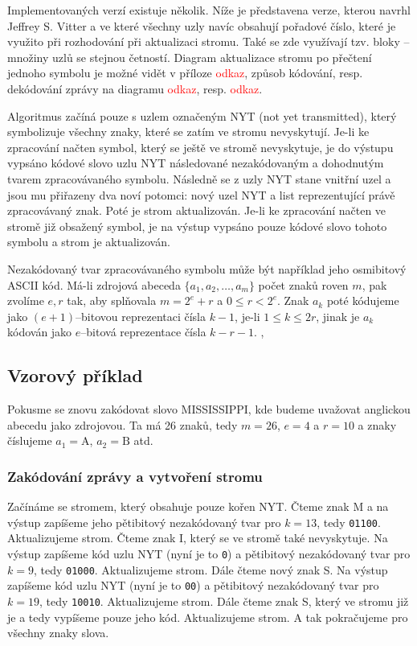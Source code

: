 Implementovaných verzí existuje několik. Níže je představena verze, kterou navrhl Jeffrey S. Vitter a ve které všechny uzly navíc obsahují pořadové číslo, které je využito při rozhodování při aktualizaci stromu. Také se zde využívají tzv. bloky -- množiny uzlů se stejnou četností. Diagram aktualizace stromu po přečtení jednoho symbolu je možné vidět v příloze \textcolor{red}{odkaz}, způsob kódování, resp. dekódování zprávy na diagramu \textcolor{red}{odkaz}, resp. \textcolor{red}{odkaz}.

Algoritmus začíná pouze s uzlem označeným NYT (not yet transmitted), který symbolizuje všechny znaky, které se zatím ve stromu nevyskytují. Je-li ke zpracování načten symbol, který se ještě ve stromě nevyskytuje, je do výstupu vypsáno kódové slovo uzlu NYT následované nezakódovaným a dohodnutým tvarem zpracovávaného symbolu. Následně se z uzly NYT stane vnitřní uzel a jsou mu přiřazeny dva noví potomci: nový uzel NYT a list reprezentující právě zpracovávaný znak. Poté je strom aktualizován. Je-li ke zpracování načten ve stromě již obsažený symbol, je na výstup vypsáno pouze kódové slovo tohoto symbolu a strom je aktualizován.

Nezakódovaný tvar zpracovávaného symbolu může být například jeho osmibitový ASCII kód. Má-li zdrojová abeceda $\{a_1, a_2, \ldots, a_m\}$ počet znaků roven $m$, pak zvolíme $e,r$ tak, aby splňovala $m= 2^e + r$ a $0 \leq r < 2^e$. Znak $a_k$ poté kódujeme jako $(e+1)$--bitovou reprezentaci čísla $k-1$, je-li $1 \leq k \leq 2r$, jinak je $a_k$ kódován jako $e$--bitová reprezentace čísla $k-r-1$. \cite{dataCompression}, \cite{introductionToDataCompression}

\subsection{Vzorový příklad}
Pokusme se znovu zakódovat slovo MISSISSIPPI, kde budeme uvažovat anglickou abecedu jako zdrojovou. Ta má 26 znaků, tedy $m=26$, $e = 4$ a $r=10$ a znaky číslujeme $a_1 = \mathrm{A}$, $a_2 = \mathrm{B}$ atd.

\subsubsection{Zakódování zprávy a vytvoření stromu}
Začínáme se stromem, který obsahuje pouze kořen NYT. Čteme znak M a na výstup zapíšeme jeho pětibitový nezakódovaný tvar pro $k=13$, tedy \texttt{01100}. Aktualizujeme strom. Čteme znak I, který se ve stromě také nevyskytuje. Na výstup zapíšeme kód uzlu NYT (nyní je to \texttt{0}) a pětibitový nezakódovaný tvar pro $k=9$, tedy \texttt{01000}. Aktualizujeme strom. Dále čteme nový znak S. Na výstup zapíšeme kód uzlu NYT (nyní je to \texttt{00}) a pětibitový nezakódovaný tvar pro $k=19$, tedy \texttt{10010}. Aktualizujeme strom. Dále čteme znak S, který ve stromu již je a tedy vypíšeme pouze jeho kód. Aktualizujeme strom. A tak pokračujeme pro všechny znaky slova.

